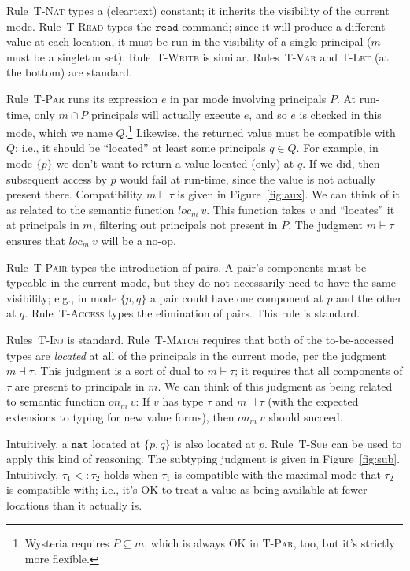 \documentclass[10pt]{article}
\newcommand{\rulelab}[1]{{\small \textsc{#1}}}
\newcommand{\kw}[1]{\ensuremath{\mathtt{#1}}}
\newcommand{\tnat}{\ensuremath{\mathtt{nat}}}
\newcommand{\subtype}{\ensuremath{<:}}
\newcommand{\issub}[2]{{#1} \subtype {#2}}
\newcommand{\locof}[2]{\ensuremath{\mathit{loc}_{#1}~{#2}}}
\newcommand{\getat}[2]{\ensuremath{\mathit{on}_{#1}~{#2}}}
\begin{document}
Rule~\rulelab{T-Nat} types a (cleartext) constant; it inherits the
visibility of the current mode. Rule~\rulelab{T-Read} types the
\kw{read} command; since it will produce a different value at each
location, it must be run in the visibility of a single principal ($m$
must be a singleton set). Rule~\rulelab{T-Write} is
similar. Rules~\rulelab{T-Var} and \rulelab{T-Let} (at the bottom) are standard.

Rule~\rulelab{T-Par} runs its expression $e$ in par
mode involving principals $P$. At run-time, only $m \cap P$ principals
will actually execute $e$, and so $e$ is checked in this mode, which
we name $Q$.\footnote{Wysteria requires $P \subseteq m$, which is
  always OK in \rulelab{T-Par}, too, but it's strictly more flexible.}
Likewise, the returned value must be compatible with $Q$;
i.e., it should be ``located'' at least some principals $q \in Q$.
For example, in mode $\{p\}$ we don't want to return a value located
(only) at $q$. If we did, then subsequent access by $p$ would fail at
run-time, since the value is not actually present there.
%
Compatibility $m \vdash \tau$ is given in Figure~\ref{fig:aux}. We can
think of it as related to the semantic function $\locof{m}{v}$. This
function takes $v$ and ``locates'' it at principals in $m$, filtering
out principals not present in $P$. The judgment $m \vdash \tau$
ensures that $\locof{m}{v}$ will be a no-op.

Rule~\rulelab{T-Pair} types the introduction of pairs. A pair's
components must be typeable in the current mode, but they do not
necessarily need to have the same visibility; e.g., in mode $\{p,q\}$
a pair could have one component at $p$ and the other at
$q$. Rule~\rulelab{T-Access} types the elimination of pairs. This rule
is standard.

Rules~\rulelab{T-Inj} is standard. Rule~\rulelab{T-Match} requires
that both of the to-be-accessed types are \emph{located} at all of the
principals in the current mode, per the judgment $m \dashv \tau$. This
judgment is a sort of dual to $m \vdash \tau$; it requires that all
components of $\tau$ are present to principals in $m$. We can think of
this judgment as being related to semantic function $\getat{m}{v}$: If $v$
has type $\tau$ and $m \dashv \tau$ (with the expected extensions to
typing for new value forms), then $\getat{m}{v}$ should succeed.

Intuitively, a $\tnat$ located at $\{p,q\}$ is also located at
$p$. Rule~\rulelab{T-Sub} can be used to apply this kind of
reasoning. The subtyping judgment is given in
Figure~\ref{fig:sub}. Intuitively, $\issub{\tau_1}{\tau_2}$ holds when
$\tau_1$ is compatible with the maximal mode that $\tau_2$ is
compatible with; i.e., it's OK to treat a value as being available at
fewer locations than it actually is.
\end{document}
